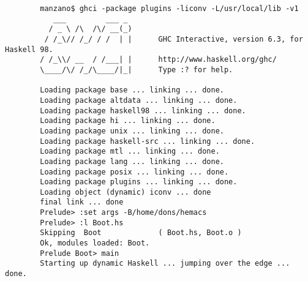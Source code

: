 \begin{verbatim}
        manzano$ ghci -package plugins -liconv -L/usr/local/lib -v1
           ___         ___ _
          / _ \ /\  /\/ __(_)
         / /_\// /_/ / /  | |      GHC Interactive, version 6.3, for Haskell 98.
        / /_\\/ __  / /___| |      http://www.haskell.org/ghc/
        \____/\/ /_/\____/|_|      Type :? for help.

        Loading package base ... linking ... done.
        Loading package altdata ... linking ... done.
        Loading package haskell98 ... linking ... done.
        Loading package hi ... linking ... done.
        Loading package unix ... linking ... done.
        Loading package haskell-src ... linking ... done.
        Loading package mtl ... linking ... done.
        Loading package lang ... linking ... done.
        Loading package posix ... linking ... done.
        Loading package plugins ... linking ... done.
        Loading object (dynamic) iconv ... done
        final link ... done
        Prelude> :set args -B/home/dons/hemacs
        Prelude> :l Boot.hs
        Skipping  Boot             ( Boot.hs, Boot.o )
        Ok, modules loaded: Boot.
        Prelude Boot> main
        Starting up dynamic Haskell ... jumping over the edge ... done.
\end{verbatim}

